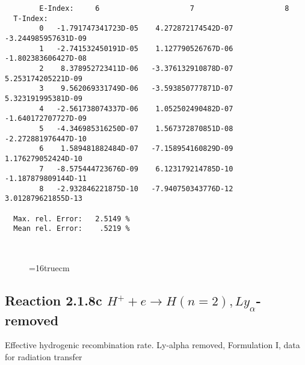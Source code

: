 \documentclass[12pt]{article}
\begin{document}
\begin{small}
\begin{verbatim}
        E-Index:     6                     7                     8
  T-Index:
        0   -1.791747341723D-05    4.272872174542D-07   -3.244985957631D-09
        1   -2.741532450191D-05    1.127790526767D-06   -1.802383606427D-08
        2    8.378952723411D-06   -3.376132910878D-07    5.253174205221D-09
        3    9.562069331749D-06   -3.593850777871D-07    5.323191995381D-09
        4   -2.561738074337D-06    1.052502490482D-07   -1.640172707727D-09
        5   -4.346985316250D-07    1.567372870851D-08   -2.272881976447D-10
        6    1.589481882484D-07   -7.158954160829D-09    1.176279052424D-10
        7   -8.575444723676D-09    6.123179214785D-10   -1.187879809144D-11
        8   -2.932846221875D-10   -7.940750343776D-12    3.012879621855D-13

  Max. rel. Error:   2.5149 %
  Mean rel. Error:    .5219 %



\end{verbatim}\end{small}
\begin{figure} \label{2.1.8b}
\epsfxsize=16truecm
\end{figure}
\newpage
\subsection{
Reaction 2.1.8c  $H^+ + e \rightarrow H(n=2), Ly_\alpha$-removed
}


   Effective hydrogenic recombination rate.
   Ly-alpha removed, Formulation I, data for radiation transfer
\end{document}
